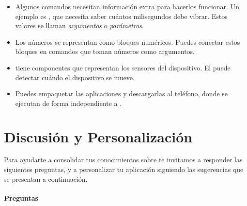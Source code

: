 \documentclass[letterpaper]{article}
\begin{document}
\begin{itemize}
\begin{itemize}
\item Algunos comandos necesitan información extra para hacerlos
  funcionar. Un ejemplo es , que necesita saber
  cuántos milisegundos debe vibrar. Estos valores se llaman
  \emph{argumentos} o \emph{parámetros}.

\item Los números se representan como bloques numéricos. Puedes
  conectar estos bloques en comandos que toman números como
  argumentos.

\item \AppInventor tiene componentes que representan los sensores del
  dispositivo. El  puede detectar cuándo el
  dispositivo se mueve.

\item Puedes empaquetar las aplicaciones y descargarlas al teléfono,
  donde se ejecutan de forma independiente a \AppInventor.

\end{itemize}

\end{itemize}

\section{Discusión y Personalización}
\label{sec:disc-y-pers}

Para ayudarte a consolidar tus conocimientos sobre \AppInventor te
invitamos a responder las siguientes preguntas, y a personalizar tu
aplicación siguiendo las sugerencias que se presentan a continuación.

\paragraph{Preguntas}
\end{document}
